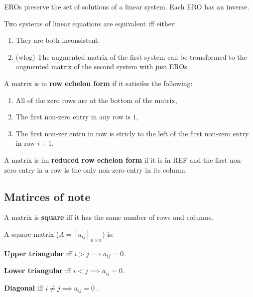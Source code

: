 \documentclass[../Year1.tex]{subfiles}
\begin{document}
\begin{remark}
    EROs preserve the set of solutions of a linear system. Each ERO has an inverse.
\end{remark}

\begin{definition}
    Two systems of linear equations are equivalent iff either:
    \begin{enumerate}
        \item They are both inconsistent.
        \item (wlog) The augmented matrix of the first system can be transformed to the augmented matrix of the second system with just EROs.
    \end{enumerate}
\end{definition}

\begin{definition}
    A matrix is in \textbf{row echelon form} if it satisifes the following: \begin{enumerate}
        \item All of the zero rows are at the bottom of the matrix,
        \item The first non-zero entry in any row is $1$,
        \item The first non-zer entru in row is stricly to the left of the first non-zero entry in row $i+1$.
    \end{enumerate}
\end{definition}

\begin{definition}
    A matrix is im \textbf{reduced row echelon form} if it is in REF and the first non-zero entry in a row is the only non-zero entry in its column.
\end{definition}

\subsection{Matirces of note}

\begin{definition}
    A matrix is \textbf{square} iff it has the same number of rows and columns.
\end{definition}

\begin{definition}
    A square matrix ($A = [a_{ij}]_{n\times n}$) is: \begin{enumerate*}
        \item \textbf{Upper triangular} iff $i>j \implies a_{ij}=0$.
        \item \textbf{Lower triangular} iff $i<j \implies a_{ij}=0$.
        \item \textbf{Diagonal} iff $i\neq j \implies a_{ij}=0$ .
    \end{enumerate*}
\end{definition}
\end{document}
